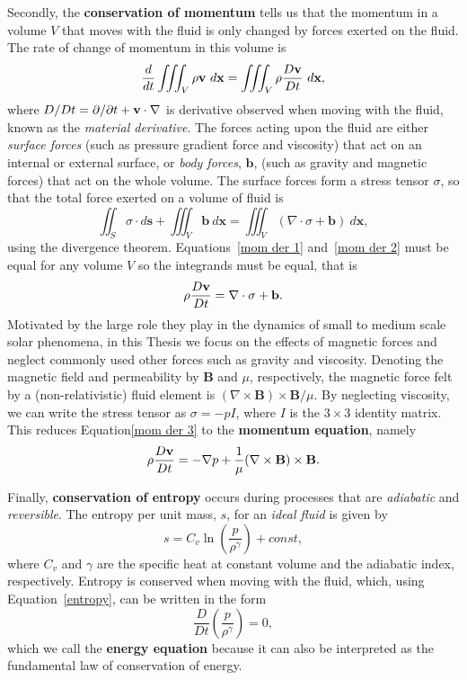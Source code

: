\documentclass[12pt]{../style-files/ociamthesis}
\begin{document}
Secondly, the \textbf{conservation of momentum} tells us that the momentum in a volume $V$ that moves with the fluid is only changed by forces exerted on the fluid. The rate of change of momentum in this volume is
\begin{equation}
	\frac{d}{dt} \iiint_V \rho\mathbf{v} ~d\mathbf{x} = \iiint_V \rho\frac{D\mathbf{v}}{Dt} ~d\mathbf{x}, \label{mom der 1}
\end{equation}
where $D/Dt = \partial/\partial t + \mathbf{v}\cdot\nabla$ is derivative observed when moving with the fluid, known as the \textit{material derivative}. The forces acting upon the fluid are either \textit{surface forces} (such as pressure gradient force and viscosity) that act on an internal or external surface, or \textit{body forces}, $\mathbf{b}$, (such as gravity and magnetic forces) that act on the whole volume. The surface forces form a stress tensor $\sigma$, so that the total force exerted on a volume of fluid is
\begin{equation}
	\iint_S \sigma\cdot d\mathbf{s} + \iiint_V \mathbf{b} ~d\mathbf{x} = \iiint_V (\nabla\cdot \sigma + \mathbf{b}) ~d\mathbf{x}, \label{mom der 2}
\end{equation}
using the divergence theorem. Equations~\eqref{mom der 1} and~\eqref{mom der 2} must be equal for any volume $V$ so the integrands must be equal, that is
\begin{equation}
\rho\frac{D\mathbf{v}}{Dt} = \nabla\cdot \sigma + \mathbf{b}. \label{mom der 3}
\end{equation}
Motivated by the large role they play in the dynamics of small to medium scale solar phenomena, in this Thesis we focus on the effects of magnetic forces and neglect commonly used other forces such as gravity and viscosity. Denoting the magnetic field and permeability by $\mathbf{B}$ and $\mu$, respectively, the magnetic force felt by a (non-relativistic) fluid element is $(\nabla\times\mathbf{B})\times\mathbf{B}/\mu$. By neglecting viscosity, we can write the stress tensor as $\sigma = -pI$, where $I$ is the $3\times3$ identity matrix. This reduces Equation\eqref{mom der 3} to the \textbf{momentum equation}, namely
\begin{equation}
\rho\frac{D\mathbf{v}}{Dt} = -\nabla p + \frac{1}{\mu}(\nabla\times\mathbf{B})\times\mathbf{B}. \label{mom eqn}
\end{equation}

Finally, \textbf{conservation of entropy} occurs during processes that are \textit{adiabatic} and \textit{reversible}. The entropy per unit mass, $s$, for an \textit{ideal fluid} is given by
\begin{equation}
	s = C_v\ln\left(\frac{p}{\rho^\gamma}\right) + const, \label{entropy}
\end{equation}
where $C_v$ and $\gamma$ are the specific heat at constant volume and the adiabatic index, respectively. Entropy is conserved when moving with the fluid, which, using Equation~\eqref{entropy}, can be written in the form
\begin{equation}
\frac{D}{Dt}\left(\frac{p}{\rho^\gamma}\right) = 0, \label{energy eqn}
\end{equation}
which we call the \textbf{energy equation} because it can also be interpreted as the fundamental law of conservation of energy.
\end{document}
